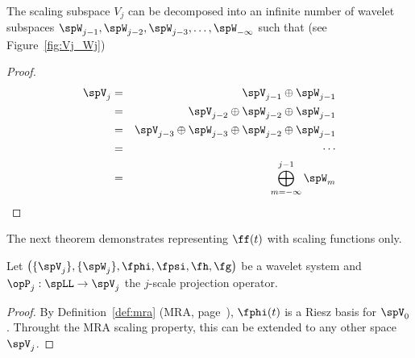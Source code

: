 \begin{proposition}
\label{prop:VkW}
The scaling subspace $V_j$ can be decomposed into an infinite number of
wavelet subspaces $\spW_{j-1}, \spW_{j-2}, \spW_{j-3}, \ldots, \spW_{-\infty}$ such that
(see Figure~\ref{fig:Vj_Wj}) 
\end{proposition}
\begin{proof}
\begin{eqnarray*}
   \spV_j &=& \spV_{j-1} \oplus \spW_{j-1} \\
       &=& \spV_{j-2} \oplus \spW_{j-2} \oplus \spW_{j-1} \\
       &=& \spV_{j-3} \oplus \spW_{j-3} \oplus \spW_{j-2} \oplus \spW_{j-1} \\
       &=& \cdots \\
       &=& \bigoplus\limits_{m=-\infty}^{j-1}{\spW_m}
\end{eqnarray*}
\end{proof}

The next theorem demonstrates representing $\ff(t)$ with scaling functions only.
\begin{theorem}
\label{thm_fx_v}
Let $\left(\{\spV_j\},\{\spW_j\}, \fphi,\fpsi,\fh,\fg\right)$
be a wavelet system and
$\opP_j:\spLL\to\spV_j$ the $j$-scale projection operator.
\end{theorem}
\begin{proof}
By Definition~\ref{def:mra} (MRA, page~\pageref{def:mra}),
$\fphi(t)$ is a Riesz basis for $\spV_0$.
Throught the MRA scaling property,
this can be extended to any other space $\spV_j$.
\end{proof}

